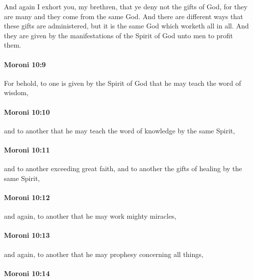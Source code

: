 			And again I exhort you, my brethren,
			that ye deny not the gifts of God,
			for they are many and they come from the same God.
			And there are different ways that these gifts are administered,
			but it is the same God which worketh all in all.
			And they are given by the manifestations of the Spirit of God
			unto men to profit them.

		\paragraph{Moroni 10:9} %
			\label{MORONI-10-9}

			For behold, to one is given by the Spirit of God
			that he may teach the word of wisdom,

		\paragraph{Moroni 10:10} %
			\label{MORONI-10-10}

			and to another that he may teach the word of knowledge by the same Spirit,

		\paragraph{Moroni 10:11} %
			\label{MORONI-10-11}

			and to another exceeding great faith,
			and to another the gifts of healing by the same Spirit,

		\paragraph{Moroni 10:12} %
			\label{MORONI-10-12}

			and again, to another that he may work mighty miracles,

		\paragraph{Moroni 10:13} %
			\label{MORONI-10-13}

			and again, to another that he may prophesy concerning all things,

		\paragraph{Moroni 10:14} %
			\label{MORONI-10-14}

